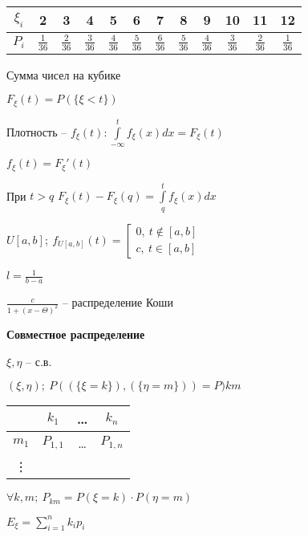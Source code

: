\documentclass[14pt, letter paper]{article}
\begin{document}
\begin{center}
    \begin{tabular}{|c|c|c|c|c|c|c|c|c|c|c|c|}
        \hline
        $\xi_i$ & 2 & 3 & 4 & 5 & 6 & 7 & 8 & 9 & 10 & 11 & 12 \\
        \hline
        $P_i$ & $\frac{1}{36}$ & $\frac{2}{36}$ & $\frac{3}{36}$ & $\frac{4}{36}$ & $\frac{5}{36}$ & $\frac{6}{36}$ & $\frac{5}{36}$ & $\frac{4}{36}$ & $\frac{3}{36}$ & $\frac{2}{36}$ & $\frac{1}{36}$ \\
        \hline
    \end{tabular}
    
    {\footnotesize Сумма чисел на кубике}
\end{center}

$F_\xi(t) = P(\{\xi < t\})$

Плотность -- $f_\xi(t) : \int\limits_{-\infty}^t f_\xi(x)dx = F_\xi(t)$

$f_\xi(t) = F_\xi'(t)$

При $t > q$ $F_\xi(t) - F_\xi(q) = \int\limits_q^t f_\xi(x) dx$

$U[a, b];\ f_{U[a,b]}(t) = \left[ \begin{gathered}
    0,\ t \not\in [a, b] \\
    c,\ t \in [a, b]
\end{gathered} \right.$

$l = \frac{1}{b-a}$

\vspace{3mm}

$\frac{c}{1 + (x - \Theta)^2}$ -- распределение Коши

\textbf{Совместное распределение}

$\xi, \eta$ -- с.в.

$(\xi, \eta);\ P((\{\xi = k\}),(\{\eta = m\})) = P){km}$

\begin{center}
    \begin{tabular}{|c|c|c|c|}
        \hline
        & $k_1$ & \ldots & $k_n$ \\
        \hline
        $m_1$ & $P_{1,1}$ & \ldots & $P_{1, n}$ \\
        \hline
        \vdots & & &\\
        \hline
    \end{tabular}
\end{center}

$\forall k, m;\ P_{km} = P(\xi = k) \cdot P(\eta = m)$

$E_\xi = \sum\limits_{i=1}^n k_i p_i$
\end{document}

